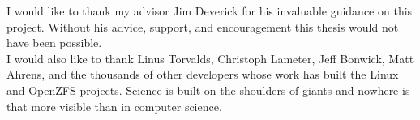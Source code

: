 \large
{\parindent0pt 
I would like to thank my advisor Jim Deverick for his invaluable guidance on this project.
Without his advice, support, and encouragement this thesis would not have been possible.\\

I would also like to thank Linus Torvalds, Christoph Lameter, Jeff Bonwick, Matt Ahrens,
and the thousands of other developers whose work has built the Linux and OpenZFS projects.
Science is built on the shoulders of giants and nowhere is that more visible than in computer science.\\
}

